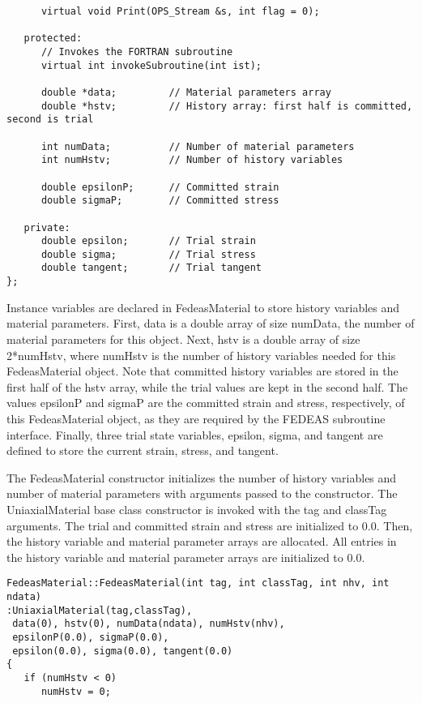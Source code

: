 \documentclass[12pt]{article}
\begin{document}
{{\begin{verbatim}
      virtual void Print(OPS_Stream &s, int flag = 0);
     
   protected:
      // Invokes the FORTRAN subroutine
      virtual int invokeSubroutine(int ist);
     
      double *data;         // Material parameters array
      double *hstv;         // History array: first half is committed, second is trial
     
      int numData;          // Number of material parameters
      int numHstv;          // Number of history variables
     
      double epsilonP;      // Committed strain
      double sigmaP;        // Committed stress
     
   private:
      double epsilon;       // Trial strain
      double sigma;         // Trial stress
      double tangent;       // Trial tangent
};
\end{verbatim}
}

Instance variables are declared in FedeasMaterial to store history variables and material
parameters.  First, data is a double array of size numData, the number of material
parameters for this object. Next, hstv is a double array of size 2*numHstv, where numHstv is
the number of history variables needed for this FedeasMaterial object. Note that committed
history variables are stored in the first half of the hstv array, while the trial values
are kept in the second half. The values epsilonP and sigmaP are the committed strain and
stress, respectively, of this FedeasMaterial object, as they
are required by the FEDEAS subroutine interface. Finally, three trial state variables,
epsilon, sigma, and tangent are defined to store the current strain, stress, and tangent.

The FedeasMaterial constructor initializes the number of history variables and number
of material parameters with arguments passed to the constructor. The UniaxialMaterial
base class constructor is invoked with the tag and classTag arguments. The trial and
committed strain and stress are initialized to $0.0$. Then, the
history variable and material parameter arrays are allocated. All entries in the history
variable and material parameter arrays are initialized to $0.0$.

{\sf\small
\begin{verbatim}
FedeasMaterial::FedeasMaterial(int tag, int classTag, int nhv, int ndata)
:UniaxialMaterial(tag,classTag),
 data(0), hstv(0), numData(ndata), numHstv(nhv),
 epsilonP(0.0), sigmaP(0.0),
 epsilon(0.0), sigma(0.0), tangent(0.0)
{
   if (numHstv < 0)
      numHstv = 0;
     

\end{verbatim}}}
\end{document}
